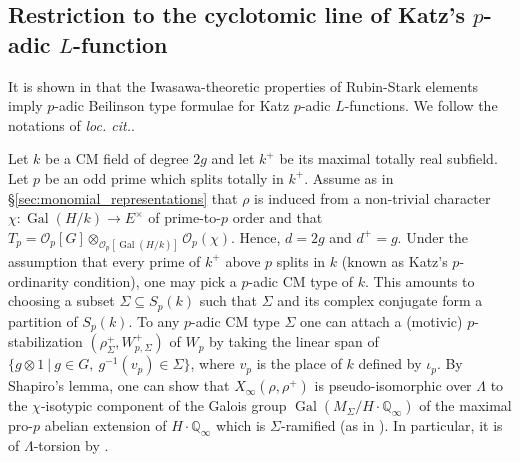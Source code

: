 \documentclass[12pt]{amsart}
\newcommand\bQ{\mathbb{Q}}
\newcommand\cO{\mathcal{O}}
\DeclareMathOperator{\Gal}{Gal}
\theoremstyle{defstyle}
\theoremstyle{thmstyle}
\begin{document}
\subsection{Restriction to the cyclotomic line of Katz's $p$-adic $L$-function}\label{sec:exemple_katz}
It is shown in \cite{buyukboduksakamoto} that the Iwasawa-theoretic properties of Rubin-Stark elements imply $p$-adic Beilinson type formulae for Katz $p$-adic $L$-functions. We follow the notations of \textit{loc. cit.}. 

Let $k$ be a CM field of degree $2g$ and let $k^+$ be its maximal totally real subfield. Let $p$ be an odd prime which splits totally in $k^+$. Assume as in \S\ref{sec:monomial_representations} that $\rho$ is induced from a non-trivial character $\chi : \Gal(H/k) \longrightarrow E^\times$ of prime-to-$p$ order and that $T_p=\cO_p[G] \otimes_{\cO_p[\Gal(H/k)]}\cO_p(\chi)$. Hence, $d=2g$ and $d^+=g$. Under the assumption that every prime of $k^+$ above $p$ splits in $k$ (known as Katz's $p$-ordinarity condition), one may pick a $p$-adic CM type of $k$. This amounts to choosing a subset $\Sigma\subseteq S_p(k)$ such that $\Sigma$ and its complex conjugate form a partition of $S_p(k)$. To any $p$-adic CM type $\Sigma$ one can attach a (motivic) $p$-stabilization $(\rho^+_\Sigma,W_{p,\Sigma}^+)$ of $W_p$ by taking the linear span of $\{g\otimes 1\ \big|\ g\in G,\ g^{-1}(v_p)\in \Sigma\}$, where $v_p$ is the place of $k$ defined by $\iota_p$. By Shapiro's lemma, one can show that $X_\infty(\rho,\rho^+)$ is pseudo-isomorphic over $\Lambda$ to the $\chi$-isotypic component of the Galois group $\Gal(M_{\Sigma}/H\cdot \bQ_\infty)$ of the maximal pro-$p$ abelian extension of $H\cdot\bQ_\infty$ which is $\Sigma$-ramified (as in \cite[\S4.2]{maks}). In particular, it is of $\Lambda$-torsion by \cite[Thm. 1.2.2 (iii)]{hidatilouine94}. 
\end{document}
